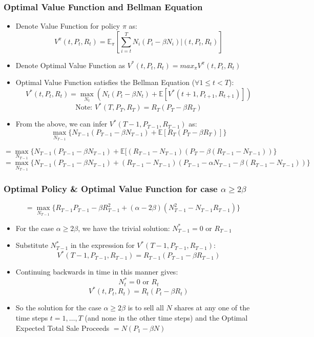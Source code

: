 \documentclass[handout]{beamer}
\begin{document}
\begin{frame}
\frametitle{Optimal Value Function and Bellman Equation}
\pause
\begin{itemize}
\item Denote Value Function for policy $\pi$ as: $$V^{\pi}(t, P_t, R_t) = \mathbb{E}_{\pi}[\sum_{i=t}^T N_i (P_i - \beta N_i)|(t,P_t,R_t)]$$
\pause
\item Denote Optimal Value Function as $V^*(t,P_t,R_t) = max_{\pi} V^{\pi}(t,P_t,R_t)$
\pause
\item Optimal Value Function satisfies the Bellman Equation ($\forall 1 \leq t < T$):
$$V^*(t,P_t,R_t) = \max_{N_t} (N_t(P_t - \beta N_t)  + \mathbb{E}[V^*(t+1, P_{t+1}, R_{t+1})])$$
\pause
$$\mbox{Note: } V^*(T, P_T,R_T) = R_T(P_T - \beta R_T)$$
\item From the above, we can infer $V^*(T-1,P_{T-1},R_{T-1})$ as:
$$\max_{N_{T-1}} \{ N_{T-1}(P_{T-1} - \beta N_{T-1})  + \mathbb{E}[R_T(P_T - \beta R_T)] \}$$
\end{itemize}
$$=\max_{N_{T-1}} \{ N_{T-1}(P_{T-1} - \beta N_{T-1})  + \mathbb{E}[(R_{T-1} - N_{T-1})(P_T - \beta(R_{T-1} - N_{T-1})) \}$$
$$=\max_{N_{T-1}} \{ N_{T-1}(P_{T-1} - \beta N_{T-1})  + (R_{T-1} - N_{T-1})(P_{T-1} - \alpha N_{T-1} - \beta(R_{T-1} - N_{T-1})) \}$$
\end{frame}

\begin{frame}
\frametitle{Optimal Policy \& Optimal Value Function for case $\alpha \geq 2\beta$}
\pause
$$=\max_{N_{T-1}} \{ R_{T-1} P_{T-1} - \beta R_{T-1}^2 + (\alpha - 2 \beta) (N_{T-1}^2 - N_{T-1}R_{T-1}) \}$$
\begin{itemize}[<+->]
\item For the case $\alpha \geq 2\beta$, we have the trivial solution: $N^*_{T-1} = 0$ or $R_{T-1}$
\item Substitute $N^*_{T-1}$ in the expression for $V^*(T-1,P_{T-1},R_{T-1})$:
$$V^*(T-1,P_{T-1},R_{T-1}) =  R_{T-1} (P_{T-1} - \beta R_{T-1})$$
\item Continuing backwards in time in this manner gives:
$$N^*_t = 0 \mbox{ or } {R_t}$$
$$V^*(t, P_t,R_t) = R_t (P_t - \beta R_t)$$
\item So the solution for the case $\alpha \geq 2\beta$ is to sell all $N$ shares at any one of the time steps $t = 1, \ldots, T$ (and none in the other time steps) and the Optimal Expected Total Sale Proceeds $ = N(P_1 - \beta N)$
\end{itemize}
\end{frame}
\end{document}
